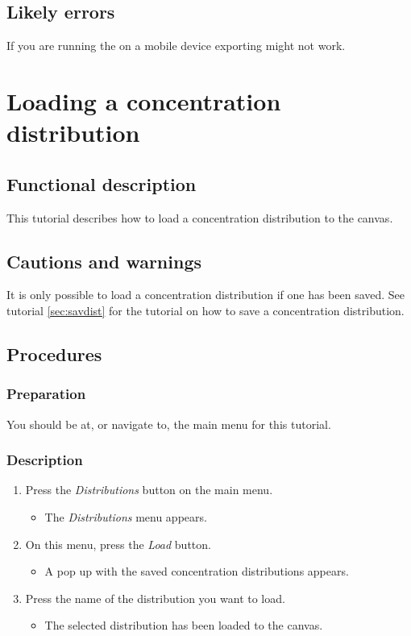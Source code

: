 \subsection{Likely errors}
If you are running the \applicationname on a mobile device exporting might not work.


\section{Loading a concentration distribution}
\label{sec:loadDist}

\subsection{Functional description}
This tutorial describes how to load a concentration distribution to the canvas.

\subsection{Cautions and warnings}
It is only possible to load a concentration distribution if one has been saved. See tutorial \ref{sec:savdist} for the tutorial on how to save a concentration distribution.

\subsection{Procedures}
\subsubsection{Preparation}
You should be at, or navigate to, the main menu for this tutorial.

\subsubsection{Description}
\begin{enumerate}
	\item Press the \emph{Distributions} button on the main menu.
		\begin{itemize}
            \item The \emph{Distributions} menu appears.
		\end{itemize}
	\item On this menu, press the \emph{Load} button.
		\begin{itemize}
            \item  A pop up with the saved concentration distributions appears.
		\end{itemize}
    \item Press the name of the distribution you want to load.
		\begin{itemize}
           \item The selected distribution has been loaded to the canvas.
		\end{itemize}
\end{enumerate}

